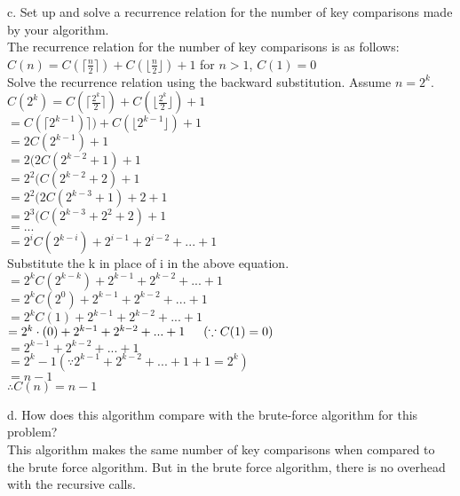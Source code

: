 \documentclass[8pt, letterpaper]{article}
\begin{document}
c. Set up and solve a recurrence relation for the number of key comparisons
made by your algorithm. \\
The recurrence relation for the number of key comparisons is as follows: \\
$C(n) = C(\lceil\frac{n}{2}\rceil) + C(\lfloor\frac{n}{2}\rfloor) + 1$ for $n > 1$, $C(1) = 0$\\
Solve the recurrence relation using the backward substitution. Assume $n = 2^k$.
\indent $C(2^k) = C(\lceil\frac{2^k}{2}\rceil) + C(\lfloor\frac{2^k}{2}\rfloor) + 1$ \\
\indent \indent \indent $ = C(\lceil2^{k-1})\rceil) + C(\lfloor2^{k-1}\rfloor) + 1 $\\
\indent \indent \indent $ = 2C(2^{k-1}) + 1$ \\
\indent \indent \indent $ = 2(2C(2^{k-2} + 1) + 1$ \\
\indent \indent \indent $ = 2^2(C(2^{k-2} + 2) + 1$ \\
\indent \indent \indent $ = 2^2(2C(2^{k-3} + 1) + 2 + 1$ \\
\indent \indent \indent $ = 2^3(C(2^{k-3} + 2^2 + 2) + 1$ \\
\indent \indent \indent $= ...$ \\
\indent \indent \indent $ = 2^{i}C(2^{k-i}) + 2^{i-1} + 2^{i-2} + ... + 1$ \\
Substitute the k in place of i in the above equation. \\
\indent \indent \indent $ = 2^{k}C(2^{k-k}) + 2^{k-1} + 2^{k-2} + ... + 1$ \\
\indent \indent \indent $ = 2^{k}C(2^{0}) + 2^{k-1} + 2^{k-2} + ... + 1$ \\
\indent \indent \indent $ = 2^{k}C(1) + 2^{k-1} + 2^{k-2} + ... + 1$ \\
\indent \indent \indent $ = 2^{k} \cdot (0) + 2^{k-1} + 2^{k-2} + ... + 1 \indent (\because C(1) = 0) $\\
\indent \indent \indent $ = 2^{k-1} + 2^{k-2} + ... + 1 $ \\
\indent \indent \indent $ = 2^{k} - 1 (\because 2^{k-1} + 2^{k-2} + ... + 1 + 1 = 2^k) $ \\
\indent \indent \indent $ = n - 1 $ \\
\indent $\therefore C(n) = n - 1$

d. How does this algorithm compare with the brute-force algorithm for this
problem? \\
This algorithm makes the same number of key comparisons when compared to the brute force algorithm. But in the brute force algorithm, there is no overhead with the recursive calls.
\end{document}
